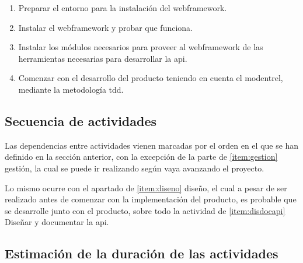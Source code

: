 \begin{enumerate}
\begin{enumerate}
    \begin{enumerate}

      \item Preparar el entorno para la instalación del \gls{webframework}.
      \item Instalar el \gls{webframework} y probar que funciona.
      \item Instalar los módulos necesarios para proveer al \gls{webframework}
        de las herramientas necesarias para desarrollar la \gls{api}.
      \item Comenzar con el desarrollo del producto teniendo en cuenta el
        \gls{modentrel}, mediante la metodología \gls{tdd}.

    \end{enumerate}


  \end{enumerate}

\end{enumerate}

\subsection{Secuencia de actividades}
Las dependencias entre actividades vienen marcadas por el orden en el que se
han definido en la sección anterior, con la excepción de la parte de
\ref{item:gestion} gestión, la cual se puede ir realizando según vaya avanzando
el proyecto.

Lo mismo ocurre con el apartado de \ref{item:diseno} diseño, el cual a pesar
de ser realizado antes de comenzar con la implementación del producto, es
probable que se desarrolle junto con el producto, sobre todo la actividad de
\ref{item:disdocapi} Diseñar y documentar la \gls{api}.

\subsection{Estimación de la duración de las actividades}

